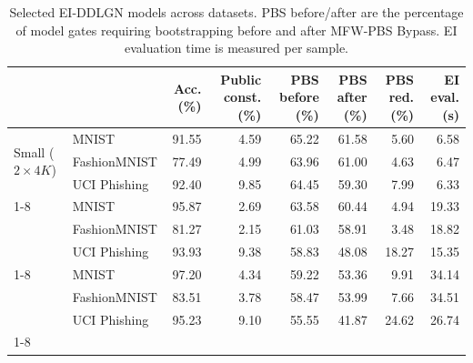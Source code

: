 \begin{table}[t]
\centering
\caption{Selected EI-DDLGN models across datasets. PBS before/after are the percentage of model gates requiring bootstrapping before and after MFW-PBS Bypass. EI evaluation time is measured per sample.}
\label{tab:fps-selected-ei-ddlgn-pbs}
\begin{tabular}{llrrrrrr}
\toprule
 &  & Acc. (\%) & Public const. (\%) & PBS before (\%) & PBS after (\%) & PBS red. (\%) & EI eval. (s) \\
\midrule
\multirow[t]{3}{*}{Small ($2\times 4K$)} & MNIST & 91.55 & 4.59 & 65.22 & 61.58 & 5.60 & 6.58 \\
 & FashionMNIST & 77.49 & 4.99 & 63.96 & 61.00 & 4.63 & 6.47 \\
 & UCI Phishing & 92.40 & 9.85 & 64.45 & 59.30 & 7.99 & 6.33 \\
\cline{1-8}
\multirow[t]{3}{*}{Medium ($4\times 6K$)} & MNIST & 95.87 & 2.69 & 63.58 & 60.44 & 4.94 & 19.33 \\
 & FashionMNIST & 81.27 & 2.15 & 61.03 & 58.91 & 3.48 & 18.82 \\
 & UCI Phishing & 93.93 & 9.38 & 58.83 & 48.08 & 18.27 & 15.35 \\
\cline{1-8}
\multirow[t]{3}{*}{Large ($6\times 8K$)} & MNIST & 97.20 & 4.34 & 59.22 & 53.36 & 9.91 & 34.14 \\
 & FashionMNIST & 83.51 & 3.78 & 58.47 & 53.99 & 7.66 & 34.51 \\
 & UCI Phishing & 95.23 & 9.10 & 55.55 & 41.87 & 24.62 & 26.74 \\
\cline{1-8}
\bottomrule
\end{tabular}
\end{table}
